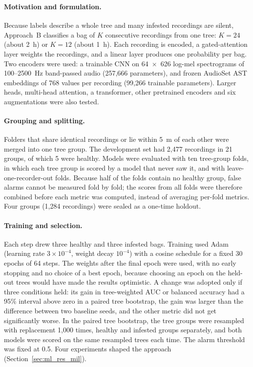 \subsubsection{}
\label{sec:ml_dev_mil}

\paragraph{Motivation and formulation.} Because labels describe a whole tree and many infested recordings are silent, Approach~B classifies a bag of $K$ consecutive recordings from one tree: $K=24$ (about 2~h) or $K=12$ (about 1~h). Each recording is encoded, a gated-attention layer weights the recordings, and a linear layer produces one probability per bag. Two encoders were used: a trainable CNN on 64~$\times$~626 log-mel spectrograms of 100--2500~Hz band-passed audio (257,666 parameters), and frozen AudioSet AST embeddings of 768 values per recording (99,266 trainable parameters). Larger heads, multi-head attention, a transformer, other pretrained encoders and six augmentations were also tested.

\paragraph{Grouping and splitting.} Folders that share identical recordings or lie within 5~m of each other were merged into one tree group. The development set had 2,477 recordings in 21 groups, of which 5 were healthy. Models were evaluated with ten tree-group folds, in which each tree group is scored by a model that never saw it, and with leave-one-recorder-out folds. Because half of the folds contain no healthy group, false alarms cannot be measured fold by fold; the scores from all folds were therefore combined before each metric was computed, instead of averaging per-fold metrics. Four groups (1,284 recordings) were sealed as a one-time holdout.

\paragraph{Training and selection.} Each step drew three healthy and three infested bags. Training used Adam (learning rate $3\times10^{-4}$, weight decay $10^{-4}$) with a cosine schedule for a fixed 30 epochs of 64 steps. The weights after the final epoch were used, with no early stopping and no choice of a best epoch, because choosing an epoch on the held-out trees would have made the results optimistic. A change was adopted only if three conditions held: its gain in tree-weighted AUC or balanced accuracy had a 95\% interval above zero in a paired tree bootstrap, the gain was larger than the difference between two baseline seeds, and the other metric did not get significantly worse. In the paired tree bootstrap, the tree groups were resampled with replacement 1,000 times, healthy and infested groups separately, and both models were scored on the same resampled trees each time. The alarm threshold was fixed at 0.5. Four experiments shaped the approach (Section~\ref{sec:ml_res_mil}).


